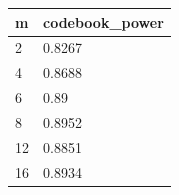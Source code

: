 \begin{tabular}{ll}
\hline
m & codebook\_power \\
\hline
2 & 0.8267 \\
4 & 0.8688 \\
6 & 0.89 \\
8 & 0.8952 \\
12 & 0.8851 \\
16 & 0.8934 \\
\hline
\end{tabular}
